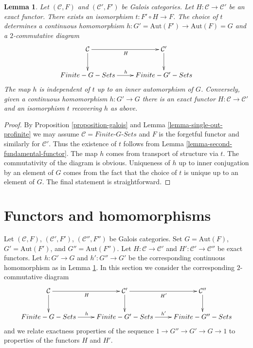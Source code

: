 \documentclass{stacks-project}
\theoremstyle{plain}
\newtheorem{lemma}[subsection]{Lemma}
\theoremstyle{definition}
\theoremstyle{remark}
\numberwithin{equation}{subsection}
\begin{document}
\begin{lemma}
\label{lemma-functoriality-galois}
Let $(\mathcal{C}, F)$ and $(\mathcal{C}', F')$ be Galois categories.
Let $H : \mathcal{C} \to \mathcal{C}'$ be an exact functor.
There exists an isomorphism $t : F' \circ H \to F$.
The choice of $t$ determines a continuous homomorphism
$h : G' = \text{Aut}(F') \to \text{Aut}(F) = G$ and
a $2$-commutative diagram
$$
\xymatrix{
\mathcal{C} \ar[r]_H \ar[d] & \mathcal{C}' \ar[d] \\
\textit{Finite-}G\textit{-Sets} \ar[r]^h &
\textit{Finite-}G'\textit{-Sets}
}
$$
The map $h$ is independent of $t$ up
to an inner automorphism of $G$.
Conversely, given a continuous homomorphism $h : G' \to G$ there
is an exact functor $H : \mathcal{C} \to \mathcal{C}'$ and an
isomorphism $t$ recovering $h$ as above.
\end{lemma}

\begin{proof}
By Proposition \ref{proposition-galois} and
Lemma \ref{lemma-single-out-profinite} we may assume
$\mathcal{C} = \textit{Finite-}G\textit{-Sets}$ and $F$ is the
forgetful functor and similarly for $\mathcal{C}'$. Thus the existence of
$t$ follows from Lemma \ref{lemma-second-fundamental-functor}. The map $h$
comes from transport of structure via $t$. The commutativity of the
diagram is obvious. Uniqueness of $h$ up to inner conjugation by
an element of $G$ comes from the fact that the choice of $t$ is
unique up to an element of $G$. The final statement is straightforward.
\end{proof}





\section{Functors and homomorphisms}
\label{section-translation}

\noindent
Let $(\mathcal{C}, F)$, $(\mathcal{C}', F')$, $(\mathcal{C}'', F'')$
be Galois categories. Set $G = \text{Aut}(F)$, $G' = \text{Aut}(F')$, and
$G'' = \text{Aut}(F'')$. Let $H : \mathcal{C} \to \mathcal{C}'$
and $H' : \mathcal{C}' \to \mathcal{C}''$ be exact functors.
Let $h : G' \to G$ and $h' : G'' \to G'$ be the corresponding
continuous homomorphism as in Lemma \ref{lemma-functoriality-galois}.
In this section we consider the corresponding $2$-commutative diagram
\begin{equation}
\label{equation-translation}
\vcenter{
\xymatrix{
\mathcal{C} \ar[r]_H \ar[d] &
\mathcal{C}' \ar[r]_{H'} \ar[d] &
\mathcal{C}'' \ar[d] \\
\textit{Finite-}G\textit{-Sets} \ar[r]^h &
\textit{Finite-}G'\textit{-Sets} \ar[r]^{h'} &
\textit{Finite-}G''\textit{-Sets}
}
}
\end{equation}
and we relate exactness properties of the sequence
$1 \to G'' \to G' \to G \to 1$ to properties of the functors $H$ and $H'$.
\end{document}
